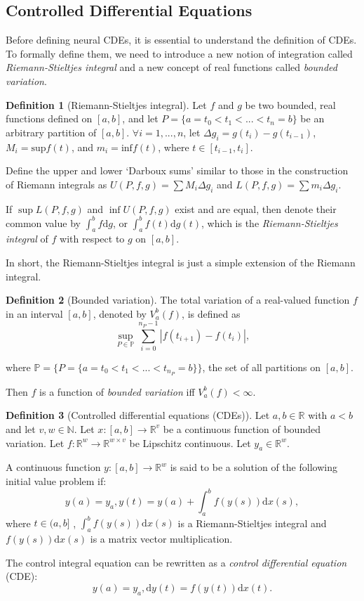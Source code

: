 \documentclass[a4paper,11pt,titlepage]{article}
\theoremstyle{definition}
\newtheorem{definition}{Definition}[section]
\theoremstyle{plain}
\theoremstyle{remark}
\begin{document}
\subsection{Controlled Differential Equations}

Before defining neural CDEs, it is essential to understand the definition of CDEs. To formally define them, we need to introduce a new notion of integration called \textit{Riemann-Stieltjes integral} and a new concept of real functions called \textit{bounded variation}.

\begin{definition}[Riemann-Stieltjes integral] Let $f$ and $g$ be two bounded, real functions defined on $[a,b]$, and let $P=\{a=t_0<t_1<...<t_n=b\}$ be an arbitrary partition of $[a,b]$. $\forall i = 1,...,n$, let $\Delta g_i = g(t_i) - g(t_{i-1})$, $M_i=\mathrm{sup}f(t)$, and $m_i=\mathrm{inf}f(t)$, where $t\in[t_{i-1},t_i]$.
    
    Define the upper and lower ‘Darboux sums’ similar to those in the construction of Riemann integrals as $U(P,f,g)=\sum M_i\Delta g_i$ and $L(P,f,g)=\sum m_i\Delta g_i$.

    If $\sup L(P,f,g)$ and $\inf U(P,f,g)$ exist and are equal, then denote their common value by $\int^b_af\mathrm{d}g$, or $\int^b_af(t)\mathrm{d}g(t)$, which is the \textit{Riemann-Stieltjes integral} of $f$ with respect to $g$ on $[a,b]$.
\end{definition}

In short, the Riemann-Stieltjes integral is just a simple extension of the Riemann integral.

\begin{definition}[Bounded variation] The total variation of a real-valued function $f$ in an interval $[a,b]$, denoted by $V_a^b(f)$, is defined as
$$\sup_{P\in\mathbb{P}}\sum_{i=0}^{n_P-1}\left|f(t_{i+1})-f(t_i)\right|,$$

where $\mathbb{P}=\{P=\{a=t_0<t_1<...<t_{n_P}=b\}\}$, the set of all partitions on $[a,b]$.

Then $f$ is a function of \textit{bounded variation} iff $V_a^b(f)<\infty$.
\end{definition}

\begin{definition}[Controlled differential equations (CDEs)]
    Let $a,b\in\mathbb{R}$ with $a<b$ and let $v,w\in\mathbb{N}$. Let $x:[a,b]\rightarrow\mathbb{R}^v$ be a continuous function of bounded variation. Let $f:\mathbb{R}^w\rightarrow\mathbb{R}^{w\times v}$ be Lipschitz continuous. Let $y_a\in\mathbb{R}^w$.
    
    A continuous function $y:[a,b]\rightarrow\mathbb{R}^w$ is said to be a solution of the following initial value problem if:
    $$y(a)=y_a, y(t)=y(a)+\int_a^bf(y(s))\mathrm{d}x(s),$$
    where $t\in(a,b]$ \cite{kidger2022neural}, $\int_a^bf(y(s))\mathrm{d}x(s)$ is a Riemann-Stieltjes integral and $f(y(s))\mathrm{d}x(s)$ is a matrix vector multiplication.

    The control integral equation can be rewritten as a \textit{control differential equation} (CDE):
    $$y(a)=y_a, \mathrm{d}y(t) = f(y(t))\mathrm{d}x(t).$$
    \end{definition}
\end{document}
